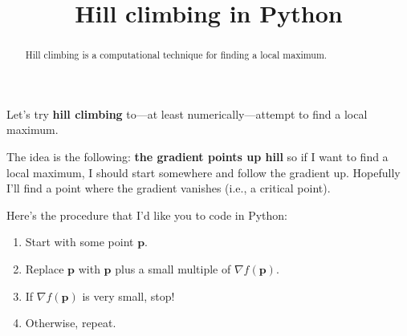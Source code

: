 \documentclass{ximera}
\title{Hill climbing in Python}
\begin{document}
\begin{abstract}
  Hill climbing is a computational technique for finding a local maximum.
\end{abstract}\maketitle

Let's try \textbf{hill climbing} to---at least numerically---attempt
to find a local maximum.

The idea is the following: \textbf{the gradient points up hill} so if
I want to find a local maximum, I should start somewhere and follow
the gradient up.  Hopefully I'll find a point where the gradient
vanishes (i.e., a critical point).

\begin{question}
  Here's the procedure that I'd like you to code in Python:
  \begin{enumerate}
  \item Start with some point $\mathbf{p}$.
  \item Replace $\mathbf{p}$ with $\mathbf{p}$ plus a small multiple of $\nabla f(\mathbf{p})$.
  \item If $\nabla f(\mathbf{p})$ is very small, stop!
  \item Otherwise, repeat.
  \end{enumerate}



\end{question}
\end{document}
